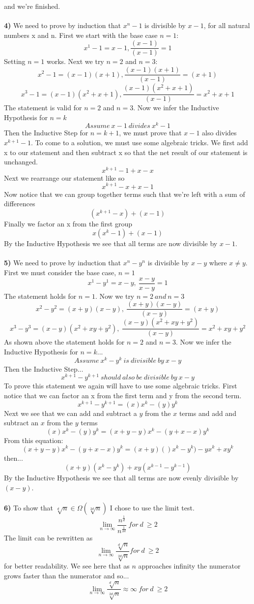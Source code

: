 \documentclass[11pt]{article}
\begin{document}
and we're finished.\\ \\
\textbf{4)} We need to prove by induction that $x^n-1$ is divisible by $x-1$, for all natural numbers x and n. First we start with the base case $n=1$: $$x^1-1=x-1, \frac{(x-1)}{(x-1)}=1$$
Setting $n=1$ works. Next we try $n=2$ and $n=3$:$$x^2-1=(x-1)(x+1), \frac{(x-1)(x+1)}{(x-1)}=(x+1)$$ $$x^3-1=(x-1)(x^2+x+1), \frac{(x-1)(x^2+x+1)}{(x-1)} = x^2+x+1$$  The statement is valid for $n=2$ and $n=3$. Now we infer the Inductive Hypothesis for $n=k$ $$Assume\ x-1\ divides\ x^k-1$$ Then the Inductive Step for $n=k+1$, we must prove that $x-1$ also divides $x^{k+1}-1$. To come to a solution, we must use some algebraic tricks. We first add x to our statement and then subtract x so that the net result of our statement is unchanged. $$x^{k+1}-1+x-x$$ Next we rearrange our statement like so$$x^{k+1}-x+x-1$$ Now notice that we can group together terms such that we're left with a sum of differences$$(x^{k+1}-x)+(x-1)$$ Finally we factor an x from the first group$$x(x^{k}-1)+(x-1)$$ By the Inductive Hypothesis we see that all terms are now divisible by $x-1$.\\ \\
\textbf{5)} We need to prove by induction that $x^n-y^n$ is divisible by $x-y$ where $x \neq y$. First we must consider the base case, $n = 1$ $$ x^1-y^1=x-y,\ \frac{x-y}{x-y} = 1$$ The statement holds for $n=1$. Now we try $n=2\ and\ n=3$ $$x^2-y^2=(x+y)(x-y),\ \frac{(x+y)(x-y)}{(x-y)}=(x+y)$$ $$x^3-y^3=(x-y)(x^2+xy+y^2),\ \frac{(x-y)(x^2+xy+y^2)}{(x-y)}=x^2+xy+y^2$$ As shown above the statement holds for $n=2$ and $n=3$. Now we infer the Inductive Hypothesis for $n=k$... 
$$Assume\ x^k-y^k\ is\ divisible\ by\ x-y$$ Then the Inductive Step... $$x^{k+1}-y^{k+1}\ should\ also\ be\ divisible\ by\ x-y$$ To prove this statement we again will have to use some algebraic tricks. First notice that we can factor an x from the first term and y from the second term. $$x^{k+1}-y^{k+1}=(x)x^k-(y)y^k$$ Next we see that we can add and subtract a $y$ from the $x$ terms and add and subtract an $x$ from the $y$ terms $$(x)x^k-(y)y^k=(x+y-y)x^k-(y+x-x)y^k$$ From this equation:$$(x+y-y)x^k-(y+x-x)y^k=(x+y)()x^k-y^k)-yx^k+xy^k$$ then... $$(x+y)(x^k-y^k)+xy(x^{k-1}-y^{k-1})$$ By the Inductive Hypothesis we see that all terms are now evenly divisible by $(x-y)$.\\ \\
\textbf{6)} To show that $\sqrt[d]{n} \in \Omega (\sqrt[2d]{n})$ I chose to use the limit test.$$\lim_{n\to\infty} \frac{n^{\frac{1}{d}}}{n^{\frac{1}{2d}}}\ for\ d\ \geq 2$$ The limit can be rewritten as $$\lim_{n \to \infty} \frac{\sqrt[d]{n}}{\sqrt[2d]{n}} for\ d\ \geq 2$$ for better readability. We see here that as $n$ approaches infinity the numerator grows faster than the numerator and so...$$\lim_{n \to \infty} \frac{\sqrt[d]{n}}{\sqrt[2d]{n}} \approx \infty\ for\ d\ \geq 2$$
\end{document}
